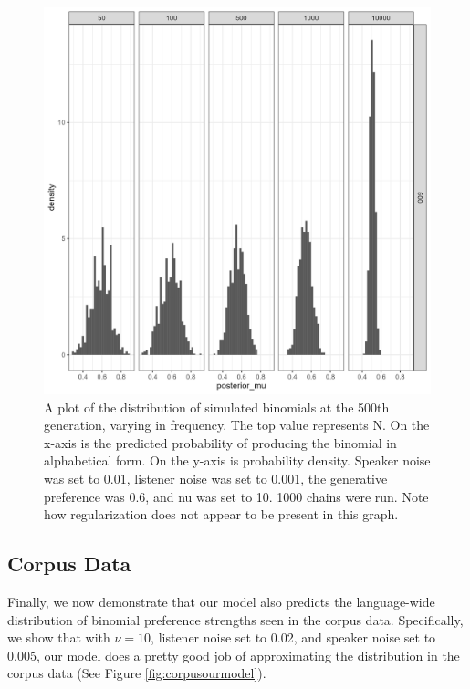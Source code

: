 \documentclass[
  jou,floatsintext]{apa6}
\begin{document}
\begin{figure}

{\centering \includegraphics[width=1\linewidth]{Figures/speaker_noise_01_listener_001} 

}

\caption{A plot of the distribution of simulated binomials at the 500th generation, varying in frequency. The top value represents N. On the x-axis is the predicted probability of producing the binomial in alphabetical form. On the y-axis is probability density. Speaker noise was set to 0.01, listener noise was set to 0.001, the generative preference was 0.6, and nu was set to 10. 1000 chains were run. Note how regularization does not appear to be present in this graph.}\label{fig:regularizationplot2}
\end{figure}

\subsection{Corpus Data}\label{corpus-data}

Finally, we now demonstrate that our model also predicts the language-wide distribution of binomial preference strengths seen in the corpus data. Specifically, we show that with \(\nu=10\), listener noise set to 0.02, and speaker noise set to 0.005, our model does a pretty good job of approximating the distribution in the corpus data (See Figure \ref{fig:corpusourmodel}).
\end{document}
